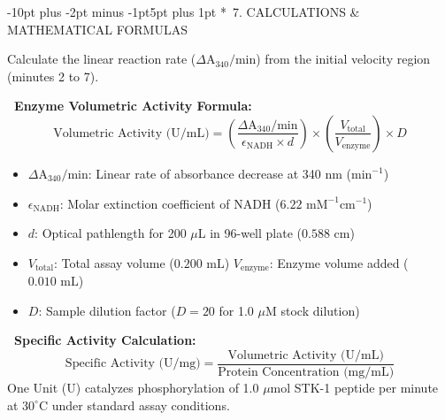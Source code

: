 \documentclass[10pt,a4paper]{article}
\makeatletter
\renewcommand\section{\@startsection{section}{1}{\z@}%
  {-10pt plus -2pt minus -1pt}{5pt plus 1pt}%
  {\normalfont\large\bfseries\color{SopNavy}}}
\makeatother
\begin{document}
\section*{\faCalculator\ 7. CALCULATIONS \& MATHEMATICAL FORMULAS}

Calculate the linear reaction rate ($\Delta \text{A}_{340}/\text{min}$) from the initial velocity region (minutes 2 to 7).

\begin{tcolorbox}[formulabox]
  \scriptsize\textbf{\color{SopNavy}\faBalanceScale\ Enzyme Volumetric Activity Formula:}
  \begin{equation*}
    \text{Volumetric Activity (U/mL)} = \left( \frac{\Delta \text{A}_{340}/\text{min}}{\epsilon_{\text{NADH}} \times d} \right) \times \left( \frac{V_{\text{total}}}{V_{\text{enzyme}}} \right) \times D
  \end{equation*}
  \vspace{-8pt}
  \begin{itemize}[leftmargin=10pt]
    \item $\Delta \text{A}_{340}/\text{min}$: Linear rate of absorbance decrease at 340 nm ($\text{min}^{-1}$)
    \item $\epsilon_{\text{NADH}}$: Molar extinction coefficient of NADH ($6.22\text{ mM}^{-1}\text{cm}^{-1}$)
    \item $d$: Optical pathlength for 200 $\mu$L in 96-well plate ($0.588\text{ cm}$)
    \item $V_{\text{total}}$: Total assay volume ($0.200\text{ mL}$) \quad \textbar \quad $V_{\text{enzyme}}$: Enzyme volume added ($0.010\text{ mL}$)
    \item $D$: Sample dilution factor ($D = 20$ for 1.0 $\mu$M stock dilution)
  \end{itemize}
\end{tcolorbox}

\begin{tcolorbox}[formulabox]
  \scriptsize\textbf{\color{SopNavy}\faBalanceScale\ Specific Activity Calculation:}
  \begin{equation*}
    \text{Specific Activity (U/mg)} = \frac{\text{Volumetric Activity (U/mL)}}{\text{Protein Concentration (mg/mL)}}
  \end{equation*}
  One Unit (U) catalyzes phosphorylation of 1.0 $\mu$mol STK-1 peptide per minute at $30^\circ\text{C}$ under standard assay conditions.
\end{tcolorbox}
\end{document}
